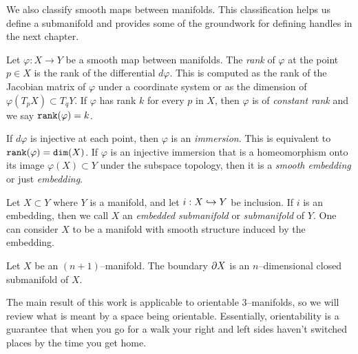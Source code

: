 We also classify smooth maps between manifolds.
This classification helps us define a submanifold and provides some of the groundwork for defining handles in the next chapter.

\begin{defn}[Embedding]
	Let $\varphi:X\to Y$ be a smooth map between manifolds.
	The \emph{rank} of $\varphi$ at the point $p\in X$ is the rank of the differential $d\varphi$.
	This is computed as the rank of the Jacobian matrix of $\varphi$ under a coordinate system or as the dimension of $\varphi(T_p X)\subset T_q Y$.
	If $\varphi$ has rank $k$ for every $p$ in $X$, then $\varphi$ is of \emph{constant rank} and we say $\texttt{rank}(\varphi)=k$.
	
	If $d\varphi$ is injective at each point, then $\varphi$ is an \emph{immersion}.
	This is equivalent to $\texttt{rank}(\varphi)=\texttt{dim}(X)$.
	If $\varphi$ is an injective immersion that is a homeomorphism onto its image $\varphi(X)\subset Y$ under the subspace topology, then it is a \emph{smooth embedding} or just \emph{embedding}.
	
	Let $X\subset Y$ where $Y$ is a manifold, and let $i:X\hookrightarrow Y$ be inclusion.
	If $i$ is an embedding, then we call $X$ an \emph{embedded submanifold} or \emph{submanifold} of $Y$.
	One can consider $X$ to be a manifold with smooth structure induced by the embedding.
\end{defn}

\begin{prop}
	\label{prop:boundariesaremanifolds}
	Let $X$ be an $(n+1)$--manifold.
	The boundary $\partial X$ is an $n$--dimensional closed submanifold of $X$.
\end{prop}

The main result of this work is applicable to orientable 3--manifolds, so we will review what is meant by a space being orientable.
Essentially, orientability is a guarantee that when you go for a walk your right and left sides haven't switched places by the time you get home.

